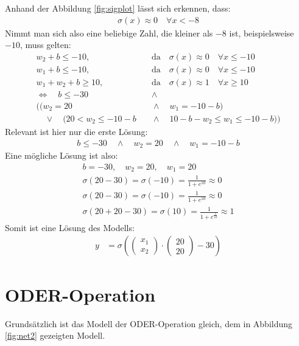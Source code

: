 \documentclass[a4paper]{report}
\begin{document}
Anhand der Abbildung \ref{fig:sigplot} lässt sich erkennen, dass:
\begin{align}
    \sigma(x)\approx0\quad \forall x< -8
\end{align}
Nimmt man sich also eine beliebige Zahl, die kleiner als $-8$ ist, beispielsweise $-10$, muss gelten:
\begin{align}
    w_2+b\leq-10,&\quad\text{da}\quad\sigma(x)\approx 0\quad\forall x\leq -10 \\
    w_1+b\leq-10,&\quad\text{da}\quad\sigma(x)\approx 0\quad\forall x\leq -10 \\
    w_1+w_2+b\geq10,&\quad\text{da}\quad\sigma(x)\approx 1\quad\forall x\geq 10 \\
    \Leftrightarrow\quad b\leq-30 &\quad\land\quad \\
    ((w_2=20 &\quad\land\quad w_1=-10-b) \\
    \quad\lor\quad (20<w_2\leq-10-b &\quad\land\quad 10-b-w_2\leq w_1 \leq -10-b))
\end{align}
Relevant ist hier nur die erste Lösung:
\begin{align}
    b\leq-30 \quad\land\quad w_2=20 \quad\land\quad w_1=-10-b
\end{align}
Eine mögliche Lösung ist also:
\begin{align}
    b=-30,\quad w_2=20,\quad w_1=20 \\
    \sigma(20-30)=\sigma(-10)=\frac{1}{1+e^{10}}\approx 0 \\
    \sigma(20-30)=\sigma(-10)=\frac{1}{1+e^{10}}\approx 0 \\
    \sigma(20+20-30)=\sigma(10)=\frac{1}{1+e^{\frac{1}{10}}}\approx 1
\end{align}
Somit ist eine Lösung des Modells:
\begin{align}
    y&=\sigma\left(\begin{pmatrix}
        x_1 \\
        x_2
    \end{pmatrix}\cdot
    \begin{pmatrix}
        20 \\
        20
    \end{pmatrix}-30\right)
\end{align}

\section{ODER-Operation}
Grundsätzlich ist das Modell der ODER-Operation gleich, dem in Abbildung \ref{fig:net2} gezeigten Modell.
\end{document}
